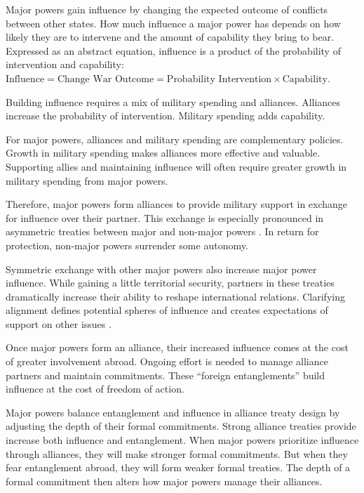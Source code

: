 \documentclass[12pt]{article}
\begin{document}
Major powers gain influence by changing the expected outcome of conflicts between other states. 
How much influence a major power has depends on how likely they are to intervene and the amount of capability they bring to bear. 
Expressed as an abstract equation, influence is a product of the probability of intervention and capability: $\mbox{Influence} = \mbox{Change War Outcome} = \mbox{Probability Intervention} \times \mbox{Capability}$.


Building influence requires a mix of military spending and alliances. 
Alliances increase the probability of intervention. 
Military spending adds capability. 


For major powers, alliances and military spending are complementary policies. 
Growth in military spending makes alliances more effective and valuable. 
Supporting allies and maintaining influence will often require greater growth in military spending from major powers. 


Therefore, major powers form alliances to provide military support in exchange for influence over their partner. 
This exchange is especially pronounced in asymmetric treaties between major and non-major powers \citep{Morrow1993}. 
In return for protection, non-major powers surrender some autonomy. 


Symmetric exchange with other major powers also increase major power influence. 
While gaining a little territorial security, partners in these treaties dramatically increase their ability to reshape international relations. 
Clarifying alignment defines potential spheres of influence and creates expectations of support on other issues \citep{Snyder1997}. 


Once major powers form an alliance, their increased influence comes at the cost of greater involvement abroad.
Ongoing effort is needed to manage alliance partners and maintain commitments.
These ``foreign entanglements'' build influence at the cost of freedom of action.


Major powers balance entanglement and influence in alliance treaty design by adjusting the depth of their formal commitments. 
Strong alliance treaties provide increase both influence and entanglement. 
When major powers prioritize influence through alliances, they will make stronger formal commitments.
But when they fear entanglement abroad, they will form weaker formal treaties. 
The depth of a formal commitment then alters how major powers manage their alliances. 
\end{document}
